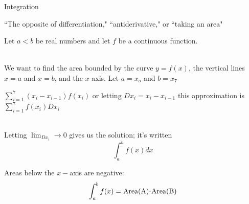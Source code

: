 \documentclass[10pt]{seminar}
\begin{document}
\newtheorem{proposition}{Proposition}

\newtheorem{definition}{Definition}

\newtheorem{corollary}{Corollary}

\newtheorem{theorem}{Theorem}

\newtheorem{lemma}{Lemma}

\def\argmax{\mathop{\rm argmax}\limits}  



\sffamily 


\begin{slide}
\begin{center}

Integration
 \end{center}
 
 \newslide
 \small 
 
 ``The opposite of differentiation," ``antiderivative," or ``taking an area"
 
 \vspace{.2in}
 \begin{center}
 
 
 \end{center}
 
 
 \newslide
 
 Let $a<b$ be real numbers and let $f$ be a continuous function. 
 
 \ \\We want to find the area bounded by the curve $y=f(x)$, the vertical lines $x=a$ and $x=b$, and the $x$-axis.  Let $a=x_o$ and $b=x_7$
 
 \begin{center}
  \end{center}
  \newslide
  
 \begin{center}
  \end{center}
  
  $\sum_{i=1}^7 (x_i-x_{i-1})f(x_i)$  or letting $Dx_i=x_i-x_{i-1}$ this approximation is
$\sum_{i=1}^7 f(x_i) Dx_i$

\ \\Letting $\lim_{Dx_i}\rightarrow 0$ gives us the solution; it's written $$\int_a^b f(x) dx$$
  
  
  \newslide
  
  Areas below the $x-$axis are negative: $$\int_a^b f(x)=\hbox{Area(A)-Area(B)}$$
  

\end{slide}
\end{document}

